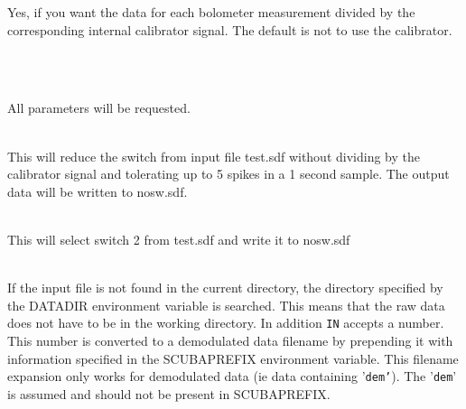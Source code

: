 \documentclass[twoside,11pt]{article}
\newcommand{\param}[1]{{\tt #1}}
\renewcommand{\_}{\texttt{\symbol{95}}}
\newlength{\sstexampleslength}
\newcommand{\sstexamples}[1]{
   \item[Examples:] \mbox{} \\
   \vspace{-3.5ex}
   \begin{description}
      #1
   \end{description}
}
\newcommand{\sstexamplesubsection}[2]{\sloppy
\item[\parbox{\sstexampleslength}{\ssttt #1}] \mbox{} \vspace{1.0ex}
\\ #2 }
\newcommand{\sstnotes}[1]{\item[Notes:] \mbox{} \\[1.3ex] #1}
\newcommand{\sstexamples}[1]{
      \item[Examples:] \\
      \begin{description}
         #1
      \end{description}
      \\
   }
\newcommand{\sstexamplesubsection}[2]{\item[{\ssttt #1}] #2}
\newcommand{\sstnotes}[1]{\item[Notes:] #1 }
\begin{document}
{{{      }{
         Yes, if you want the data for each bolometer measurement
         divided by the corresponding internal calibrator signal.
         The default is not to use the calibrator.
      }
   }
   \sstexamples{
      \sstexamplesubsection{
         reduce\_switch
      }{
         All parameters will be requested.
      }
      \sstexamplesubsection{
         reduce\_switch test nosw
      }{
         This will reduce the switch from input file test.sdf without dividing
         by the calibrator signal and tolerating up to 5 spikes in a 1 second
         sample. The output data will be written to nosw.sdf.
      }
      \sstexamplesubsection{
         reduce\_switch test nosw SWITCH=2
      }{
         This will select switch 2 from test.sdf and write it to nosw.sdf
      }
   }
   \sstnotes{
      If the input file is not found in the current directory, the directory
      specified by the DATADIR environment variable is searched. This means
      that the raw data does not have to be in the working directory. In
      addition \param{IN} accepts a number. This number is converted to a
      demodulated data filename by prepending it with information specified in
      the SCUBA\_PREFIX environment variable. This filename expansion only
      works for demodulated data (ie data containing '\texttt{\_dem\_'}). The
      '\texttt{\_dem\_}' is assumed and should not be present in
      SCUBA\_PREFIX.
   }
}
\end{document}
